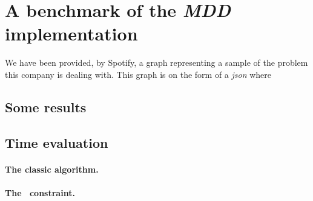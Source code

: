 \section{A benchmark of the \textit{MDD} implementation}

We have been provided, by Spotify, a graph representing a sample of the problem this company is dealing with. This graph is on the form of a \textit{json} where

\subsection{Some results}

\subsection{Time evaluation}
\paragraph{The classic algorithm.}

\paragraph{The \alldiff\ constraint.}